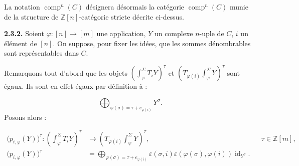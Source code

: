 La notation $\operatorname{comp}^{n}(C)$ désignera désormais la catégorie
$\operatorname{comp}^{n}(C)$ munie de la structure de
$\mathbb Z[n]$-catégorie stricte décrite ci-dessus.

\noindent\textbf{2.3.2.}\quad
Soient $\varphi\colon[n]\longrightarrow[m]$ une application, $Y$ un complexe
$n$-uple de $C$, $i$ un élément de $[n]$. On suppose, pour fixer les idées,
que les sommes dénombrables sont représentables dans $C$.

Remarquons tout d'abord que les objets
$\left(\int_\varphi^\Sigma T_iY\right)^\tau$ et
$\left(T_{\varphi(i)}\int_\varphi^\Sigma Y\right)^\tau$ sont égaux.
Ils sont en effet égaux par définition à :

\begin{equation*}
  \bigoplus_{\varphi(\sigma)=\tau+e_{\varphi(i)}}Y^\sigma.
\end{equation*}
Posons alors :

\begin{equation}
  \begin{aligned}
    \bigl(p_{i,\varphi}(Y)\bigr)^\tau\colon
    \left(\int_\varphi^\Sigma T_iY\right)^\tau
      &\longrightarrow
    \left(T_{\varphi(i)}\int_\varphi^\Sigma Y\right)^\tau,
      &&\tau\in\mathbb Z[m],\\[2pt]
    \bigl(p_{i,\varphi}(Y)\bigr)^\tau
      &=\bigoplus_{\varphi(\sigma)=\tau+e_{\varphi(i)}}
        \varepsilon(\sigma,i)\varepsilon(\varphi(\sigma),\varphi(i))
        \operatorname{id}_{Y^\sigma}.
  \end{aligned}
  \tag{2.3.2.1}
\end{equation}
